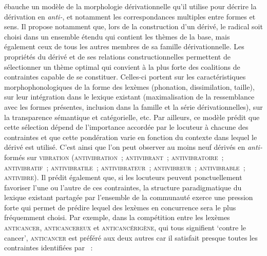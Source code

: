 \documentclass[output=paper]{langsci/langscibook}
\begin{document}
\cite{hathout2011.dumal} ébauche un modèle de la morphologie dérivationnelle qu'il utilise pour décrire la dérivation en \emph{\mbox{anti-}}, et notamment les correspondances multiples entre formes et sens.  Il propose notamment que, lors de la construction d'un dérivé, le radical soit choisi dans un ensemble étendu qui contient les thèmes de la base, mais également ceux de tous les autres membres de sa famille dérivationnelle.  Les propriétés du dérivé et de ses relations constructionnelles permettent de sélectionner un thème optimal qui convient à la plus forte des coalitions de contraintes capable de se constituer.  Celles-ci portent sur les caractéristiques morphophonologiques de la forme des lexèmes (phonation, dissimilation, taille), sur leur intégration dans le lexique existant (maximalisation de la ressemblance avec les formes présentes, inclusion dans la famille et la série dérivationnelles), sur la transparence sémantique et catégorielle, etc.  Par ailleurs, ce modèle prédit que cette sélection dépend de l'importance accordée par le locuteur à chacune des contraintes et que cette pondération varie en fonction du contexte dans lequel le dérivé est utilisé.  C'est ainsi que l'on peut observer au moins neuf dérivés en \emph{\mbox{anti-}} formés sur \textsc{vibration} (\textsc{antivibration}~; \textsc{antivibrant}~; \textsc{antivibratoire}~; \textsc{antivibratif}~; \textsc{antivibratile}~; \textsc{antivibrateur}~; \textsc{antivibreur}~; \textsc{antivibrable}~; \textsc{antivibre}).  Il prédit également que, si les locuteurs peuvent ponctuellement favoriser l'une ou l'autre de ces contraintes, la structure paradigmatique du lexique existant partagée  par l'ensemble de la communauté  exerce une pression forte qui
permet de prédire lequel des lexèmes en concurrence sera le plus fréquemment choisi.
 Par exemple, dans la compétition entre les lexèmes  \textsc{anticancer}, \textsc{anticancereux} et \textsc{anticancérigène}, qui tous signifient `contre le cancer', \textsc{anticancer} est préféré aux deux autres car il satisfait presque toutes les contraintes identifiées par \cite{hathout2011.dumal}~:
\end{document}
